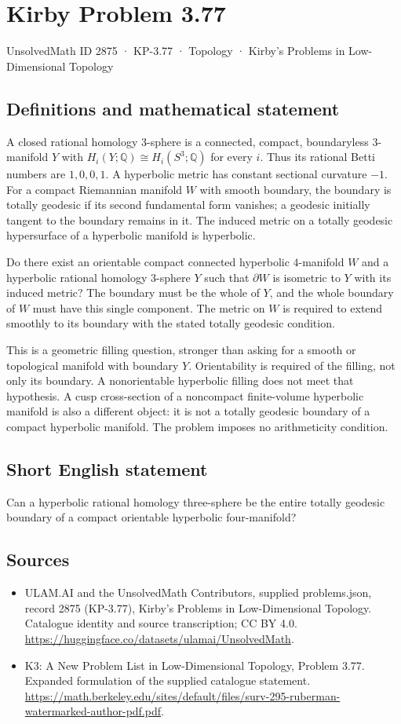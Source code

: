 \documentclass[11pt,a4paper]{article}
\begin{document}
\section*{Kirby Problem 3.77}\label{2875}
{\small UnsolvedMath ID 2875 · KP-3.77 · Topology · Kirby's Problems in Low-Dimensional Topology}
\subsection{Definitions and mathematical statement}
A closed rational homology $3$-sphere is a connected, compact, boundaryless
$3$-manifold $Y$ with $H_i(Y;\mathbb Q)\cong H_i(S^3;\mathbb Q)$ for every
$i$. Thus its rational Betti numbers are $1,0,0,1$.
A hyperbolic metric has constant sectional curvature $-1$.
For a compact Riemannian manifold $W$ with smooth boundary, the boundary
is totally geodesic if its second fundamental form vanishes; a geodesic
initially tangent to the boundary remains in it. The induced metric on
a totally geodesic hypersurface of a hyperbolic manifold is hyperbolic.

Do there exist an orientable compact connected hyperbolic $4$-manifold
$W$ and a hyperbolic rational homology $3$-sphere $Y$ such that
$\partial W$ is isometric to $Y$ with its induced metric? The boundary
must be the whole of $Y$, and the whole boundary of $W$ must have this
single component. The metric on $W$ is required to extend smoothly to
its boundary with the stated totally geodesic condition.

This is a geometric filling question, stronger than asking for a
smooth or topological manifold with boundary $Y$. Orientability is
required of the filling, not only its boundary. A nonorientable
hyperbolic filling does not meet that hypothesis. A cusp cross-section
of a noncompact finite-volume hyperbolic manifold is also a different
object: it is not a totally geodesic boundary of a compact hyperbolic
manifold. The problem imposes no arithmeticity condition.
\subsection{Short English statement}
Can a hyperbolic rational homology three-sphere be the entire totally geodesic boundary of a compact orientable hyperbolic four-manifold?
\subsection{Sources}
\begin{itemize}
\item[S1] ULAM.AI and the UnsolvedMath Contributors, supplied problems.json, record 2875 (KP-3.77), Kirby's Problems in Low-Dimensional Topology. Catalogue identity and source transcription; CC BY 4.0.
\url{https://huggingface.co/datasets/ulamai/UnsolvedMath}.
\item[S2] K3: A New Problem List in Low-Dimensional Topology, Problem 3.77. Expanded formulation of the supplied catalogue statement.
\url{https://math.berkeley.edu/sites/default/files/surv-295-ruberman-watermarked-author-pdf.pdf}.
\end{itemize}
\end{document}
